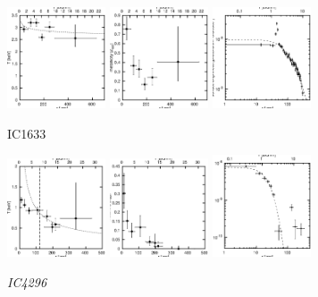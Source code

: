 \documentclass[structabstract]{aa}
\begin{document}
\begin{figure}[h]
   \centering
   \includegraphics[width=0.26\textwidth]{tprofile_ic1633.eps}
   \includegraphics[width=0.26\textwidth]{zprofile_ic1633.eps}
   \includegraphics[width=0.26\textwidth]{sbps_ic1633.eps}
   \caption{IC1633}
   \label{fig:tprofic1633}%
\end{figure}
\clearpage
\begin{figure}[h]
   \centering
   \includegraphics[width=0.26\textwidth]{tprofile_ic4296.eps}
   \includegraphics[width=0.26\textwidth]{zprofile_ic4296.eps}
   \includegraphics[width=0.26\textwidth]{sbps_ic4296.eps}
   \caption{\emph{IC4296}}
   \label{fig:tprofic4296}%
\end{figure}
\end{document}
